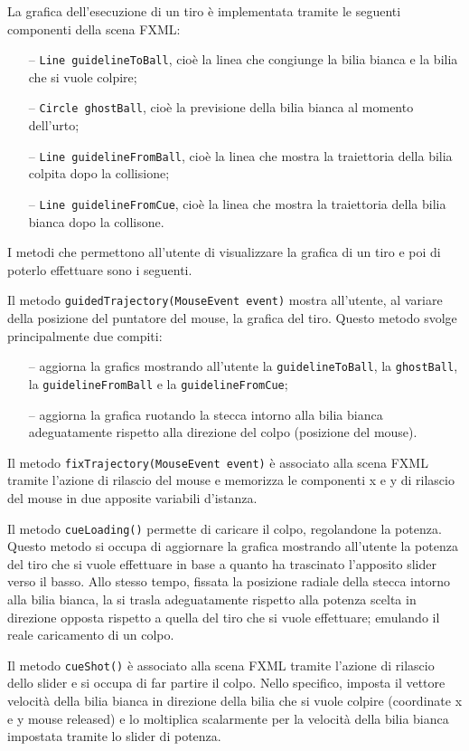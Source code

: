 \documentclass[12pt,a4paper]{report}
\begin{document}
La grafica dell'esecuzione di un tiro è implementata tramite le seguenti componenti della scena FXML:
\begin{itemize}
	\item [--] \texttt{Line guidelineToBall}, cioè la linea che congiunge la bilia bianca e la bilia che si vuole colpire;
	\item [--] \texttt{Circle ghostBall}, cioè la previsione della bilia bianca al momento dell'urto;
	\item [--] \texttt{Line guidelineFromBall}, cioè la linea che mostra la traiettoria della bilia colpita dopo la collisione;
	\item [--] \texttt{Line guidelineFromCue}, cioè la linea che mostra la traiettoria della bilia bianca dopo la collisone.
\end{itemize}
I metodi che permettono all'utente di visualizzare la grafica di un tiro e poi di poterlo effettuare sono i seguenti.

Il metodo \texttt{guidedTrajectory(MouseEvent event)} mostra all'utente, al variare della posizione del puntatore del mouse, la grafica del tiro.
Questo metodo svolge principalmente due compiti:
\begin{itemize}
	\item [--] aggiorna la grafics mostrando all'utente la \texttt{guidelineToBall}, la \texttt{ghostBall}, la \texttt{guidelineFromBall} e la \texttt{guidelineFromCue};
	\item [--] aggiorna la grafica ruotando la stecca intorno alla bilia bianca adeguatamente rispetto alla direzione del colpo (posizione del mouse).
\end{itemize}

Il metodo \texttt{fixTrajectory(MouseEvent event)} è associato alla scena FXML tramite l'azione di rilascio del mouse e memorizza le componenti x e y di rilascio del mouse in due apposite variabili d'istanza.

Il metodo \texttt{cueLoading()} permette di caricare il colpo, regolandone la potenza.
Questo metodo si occupa di aggiornare la grafica mostrando all'utente la potenza del tiro che si vuole effettuare in base a quanto ha trascinato l'apposito slider verso il basso.
Allo stesso tempo, fissata la posizione radiale della stecca intorno alla bilia bianca, la si trasla adeguatamente rispetto alla potenza scelta in direzione opposta rispetto a quella del tiro che si vuole effettuare; emulando il reale caricamento di un colpo.

Il metodo \texttt{cueShot()} è associato alla scena FXML tramite l'azione di rilascio dello slider e si occupa di far partire il colpo.
Nello specifico, imposta il vettore velocità della bilia bianca in direzione della bilia che si vuole colpire (coordinate x e y mouse released) e lo moltiplica scalarmente per la velocità della bilia bianca impostata tramite lo slider di potenza.
\end{document}
